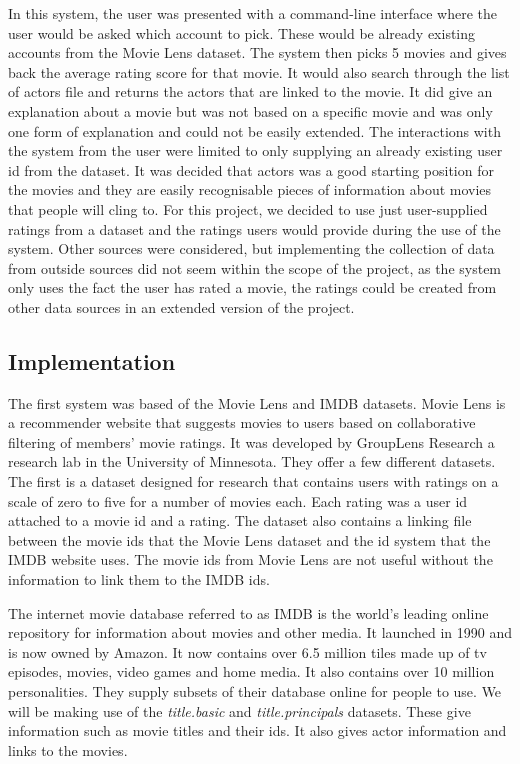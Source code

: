             In this system, the user was presented with a command-line interface where the user would be asked which account to pick. These would be already existing accounts from the Movie Lens dataset. The system then picks 5 movies and gives back the average rating score for that movie. It would also search through the list of actors file and returns the actors that are linked to the movie. 
            It did give an explanation about a movie but was not based on a specific movie and was only one form of explanation and could not be easily extended. The interactions with the system from the user were limited to only supplying an already existing user id from the dataset. It was decided that actors was a good starting position for the movies and they are easily recognisable pieces of information about movies that people will cling to. For this project, we decided to use just user-supplied ratings from a dataset and the ratings users would provide during the use of the system. Other sources were considered, but implementing the collection of data from outside sources did not seem within the scope of the project, as the system only uses the fact the user has rated a movie, the ratings could be created from other data sources in an extended version of the project. 

        \subsection{Implementation}
            The first system was based of the Movie Lens and IMDB datasets. Movie Lens is a recommender website that suggests movies to users based on collaborative filtering of members' movie ratings. It was developed by GroupLens Research a research lab in the University of Minnesota. They offer a few different datasets. The first is a dataset designed for research that contains users with ratings on a scale of zero to five for a number of movies each. Each rating was a user id attached to a movie id and a rating. The dataset also contains a linking file between the movie ids that the Movie Lens dataset and the id system that the IMDB website uses. The movie ids from Movie Lens are not useful without the information to link them to the IMDB ids.
            
            The internet movie database referred to as IMDB \cite{IMDB} is the world's leading online repository for information about movies and other media. It launched in 1990 and is now owned by Amazon. It now contains over 6.5 million tiles made up of tv episodes, movies, video games and home media. It also contains over 10 million personalities. They supply subsets of their database online for people to use. We will be making use of the \textit{title.basic} and \textit{title.principals} datasets. These give information such as movie titles and their ids. It also gives actor information and links to the movies.


